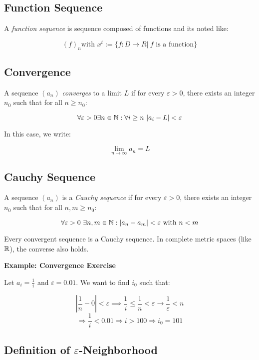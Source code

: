 \subsection{Function Sequence}

A \emph{function sequence} is sequence composed of functions and its noted like:

\[
    {(f)}_n \text{with } x^t := \{ f: D\to R | \ f \text{ is a function}\}
\]

\subsection{Convergence}

A sequence \((a_n)\) \emph{converges} to a limit \(L\) if for every \(\varepsilon > 0\), there exists an 
integer \(n_0\) such that for all \(n \ge n_0\):

\[
    \forall \varepsilon > 0 \exists n \in \mathbb{N}: \forall i \ge n\ |a_i - L| < \varepsilon
\]

In this case, we write:

\[
    \lim_{n \to \infty} a_n = L
\]

\subsection{Cauchy Sequence}

A sequence \((a_n)\) is a \emph{Cauchy sequence} if for every \(\varepsilon > 0\), there exists an 
integer \(n_0\) such that for all \(n, m \ge n_0\):

\[
    \forall \varepsilon > 0\ \exists n,m \in \mathbb{N}: |a_n - a_m| < \varepsilon\ \text{with } n < m
\]

Every convergent sequence is a Cauchy sequence. In complete metric spaces (like \(\mathbb{R}\)), the 
converse also holds.

\textbf{Example: Convergence Exercise}

Let \(a_i = \frac{1}{i}\) and \(\varepsilon = 0.01\). We want to find \(i_0\) such that:

\[
    \left|\frac{1}{n} - 0\right| < \varepsilon \implies \frac{1}{i} \le \frac{1}{n} < \varepsilon \rightarrow \frac{1}{\varepsilon} < n
\]
\[
    \Rightarrow \frac{1}{i} < 0.01 \Rightarrow i > 100
    \Rightarrow i_0 = 101
\]

\subsection{Definition of \texorpdfstring{\(\varepsilon\)}{ε}-Neighborhood}

